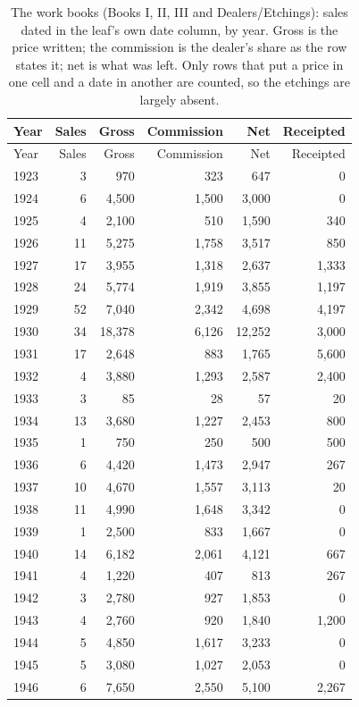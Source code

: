 \begin{longtable}{lrrrrr}
\caption{The work books (Books I, II, III and Dealers/Etchings): sales dated in the leaf's own date column, by year. Gross is the price written; the commission is the dealer's share as the row states it; net is what was left. Only rows that put a price in one cell and a date in another are counted, so the etchings are largely absent.}\label{tab:art}\\\toprule Year & Sales & Gross & Commission & Net & Receipted\\\midrule\endfirsthead
\toprule Year & Sales & Gross & Commission & Net & Receipted\\\midrule\endhead
1923 & 3 & 970 & 323 & 647 & 0\\
1924 & 6 & 4,500 & 1,500 & 3,000 & 0\\
1925 & 4 & 2,100 & 510 & 1,590 & 340\\
1926 & 11 & 5,275 & 1,758 & 3,517 & 850\\
1927 & 17 & 3,955 & 1,318 & 2,637 & 1,333\\
1928 & 24 & 5,774 & 1,919 & 3,855 & 1,197\\
1929 & 52 & 7,040 & 2,342 & 4,698 & 4,197\\
1930 & 34 & 18,378 & 6,126 & 12,252 & 3,000\\
1931 & 17 & 2,648 & 883 & 1,765 & 5,600\\
1932 & 4 & 3,880 & 1,293 & 2,587 & 2,400\\
1933 & 3 & 85 & 28 & 57 & 20\\
1934 & 13 & 3,680 & 1,227 & 2,453 & 800\\
1935 & 1 & 750 & 250 & 500 & 500\\
1936 & 6 & 4,420 & 1,473 & 2,947 & 267\\
1937 & 10 & 4,670 & 1,557 & 3,113 & 20\\
1938 & 11 & 4,990 & 1,648 & 3,342 & 0\\
1939 & 1 & 2,500 & 833 & 1,667 & 0\\
1940 & 14 & 6,182 & 2,061 & 4,121 & 667\\
1941 & 4 & 1,220 & 407 & 813 & 267\\
1942 & 3 & 2,780 & 927 & 1,853 & 0\\
1943 & 4 & 2,760 & 920 & 1,840 & 1,200\\
1944 & 5 & 4,850 & 1,617 & 3,233 & 0\\
1945 & 5 & 3,080 & 1,027 & 2,053 & 0\\
1946 & 6 & 7,650 & 2,550 & 5,100 & 2,267\\

\end{longtable}
